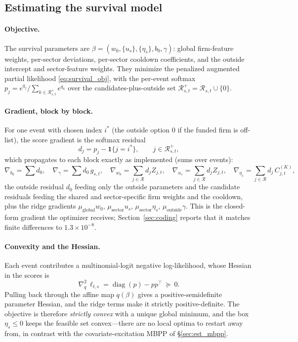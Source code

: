\documentclass[11pt]{article}
\theoremstyle{plain}
\theoremstyle{definition}
\theoremstyle{remark}
\newcommand{\cR}{\mathcal{R}}
\newcommand{\one}{\mathbf{1}}
\DeclareMathOperator{\diag}{diag}
\begin{document}
\subsection{Estimating the survival model}
\label{sec:est_survival}

\paragraph{Objective.}
The survival parameters are $\beta=(w_0,\{u_s\},\{\eta_s\},b_0,\gamma)$: global firm-feature weights, per-sector deviations, per-sector cooldown coefficients, and the outside intercept and sector-feature weights. They minimize the penalized augmented partial likelihood \eqref{eq:survival_obj}, with the per-event softmax $p_j=e^{q_j}/\sum_{k\in\cR^+_{s,t}}e^{q_k}$ over the candidates-plus-outside set $\cR^+_{s,t}=\cR_{s,t}\cup\{0\}$.

\paragraph{Gradient, block by block.}
For one event with chosen index $i^\ast$ (the outside option $0$ if the funded firm is off-list), the score gradient is the softmax residual
\begin{equation}
d_j=p_j-\one\{j=i^\ast\},\qquad j\in\cR^+_{s,t},
\label{eq:soft_resid}
\end{equation}
which propagates to each block exactly as implemented (sums over events):
\begin{equation}
\nabla_{b_0}=\sum d_0,\quad
\nabla_{\gamma}=\sum d_0\,g_{s,t},\quad
\nabla_{w_0}=\sum_{j\in\cR}d_j Z_{j,t},\quad
\nabla_{u_s}=\sum_{j\in\cR}d_j Z_{j,t},\quad
\nabla_{\eta_s}=\sum_{j\in\cR}d_j\,C^{(K)}_{j,t},
\label{eq:survival_blocks}
\end{equation}
the outside residual $d_0$ feeding only the outside parameters and the candidate residuals feeding the shared and sector-specific firm weights and the cooldown, plus the ridge gradients $\mu_{\text{global}}w_0$, $\mu_{\text{sector}}u_s$, $\mu_{\text{sector}}\eta_s$, $\mu_{\text{outside}}\gamma$. This is the closed-form gradient the optimizer receives; Section~\ref{sec:coding} reports that it matches finite differences to $1.3\times10^{-8}$.

\paragraph{Convexity and the Hessian.}
Each event contributes a multinomial-logit negative log-likelihood, whose Hessian in the scores is
\[
\nabla^2_q\,\ell_{t,s}=\diag(p)-p p^\top\ \succeq\ 0 .
\]
Pulling back through the affine map $q(\beta)$ gives a positive-semidefinite parameter Hessian, and the ridge terms make it strictly positive-definite. The objective is therefore \emph{strictly convex} with a unique global minimum, and the box $\eta_s\le0$ keeps the feasible set convex---there are no local optima to restart away from, in contrast with the covariate-excitation MBPP of \S\ref{sec:est_mbpp}.
\end{document}
